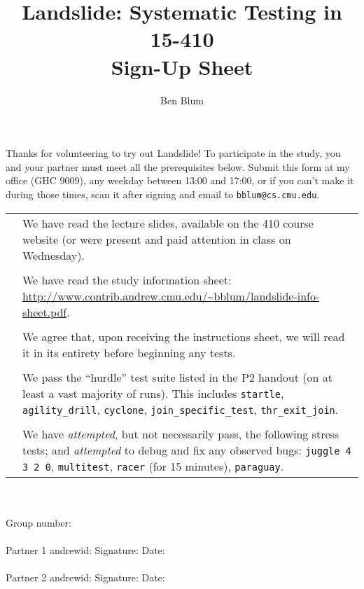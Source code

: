 \documentclass{article}
\begin{document}

\newcommand\checkbox[1]{\huge \Square & #1 \\}

\title{\bf Landslide: Systematic Testing in 15-410 \\ Sign-Up Sheet}
\author{Ben Blum}
\date{}
\maketitle

Thanks for volunteering to try out Landslide! To participate in the study, you and your partner must meet all the prerequisites below. Submit this form at my office (GHC 9009), any weekday between 13:00 and 17:00, or if you can't make it during those times, scan it after signing and email to {\tt bblum@cs.cmu.edu}.
\\

\begin{tabular}{lp{5.5in}}
	\checkbox{We have read the lecture slides, available on the 410 course website (or were present and paid attention in class on Wednesday).}

	\\
	\checkbox{We have read the study information sheet: \url{http://www.contrib.andrew.cmu.edu/~bblum/landslide-info-sheet.pdf}.}

	\\
	\checkbox{We agree that, upon receiving the instructions sheet, we will read it in its entirety before beginning any tests.}

	\\
	\checkbox{We pass the ``hurdle'' test suite listed in the P2 handout (on at least a vast majority of runs). This includes {\tt startle}, {\tt agility\_drill}, {\tt cyclone}, {\tt join\_specific\_test}, {\tt thr\_exit\_join}.}

	\\
	\checkbox{We have {\em attempted}, but not necessarily pass, the following stress tests; and {\em attempted} to debug and fix any observed bugs: {\tt juggle 4 3 2 0}, {\tt multitest}, {\tt racer} (for 15 minutes), {\tt paraguay}.}


\end{tabular}
\\
\vspace{0.5in}
\\
Group number: \underline{\hspace{1.5in}}\\
\vspace{0.5in}\\
Partner 1 andrewid: \underline{\hspace{1.5in}} Signature: \underline{\hspace{1.5in}} Date: \underline{\hspace{1in}}\\
\vspace{0.5in}\\
Partner 2 andrewid: \underline{\hspace{1.5in}} Signature: \underline{\hspace{1.5in}} Date: \underline{\hspace{1in}}
\end{document}
